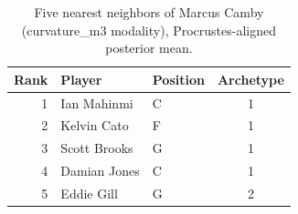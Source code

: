 \begin{table}[htbp]
  \centering\small
  \begin{tabular}{rllc}
    \toprule
    Rank & Player & Position & Archetype \\
    \midrule
    1 & Ian Mahinmi & C & 1 \\
    2 & Kelvin Cato & F & 1 \\
    3 & Scott Brooks & G & 1 \\
    4 & Damian Jones & C & 1 \\
    5 & Eddie Gill & G & 2 \\
    \bottomrule
  \end{tabular}
  \caption{Five nearest neighbors of Marcus Camby (curvature_m3 modality), Procrustes-aligned posterior mean.}
  \label{tab:Marcus_Camby_neighbors_curvature_m3}
\end{table}

